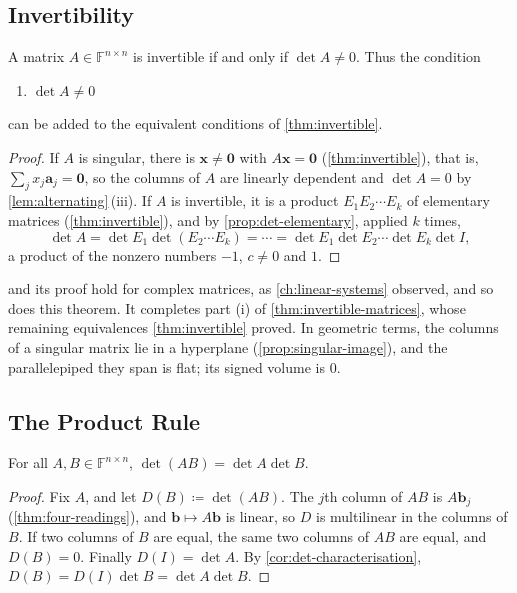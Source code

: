 \subsection{Invertibility}

\begin{theorem}
\label{thm:det-invertible}
A matrix $A\in\mathbb F^{n\times n}$ is invertible if and only if $\det A\ne0$. Thus the condition
\begin{enumerate}
\item[(x)] $\det A\ne0$
\end{enumerate}
can be added to the equivalent conditions of \cref{thm:invertible}.
\end{theorem}

\begin{proof}
If $A$ is singular, there is $\mathbf x\ne\mathbf 0$ with $A\mathbf x=\mathbf 0$ (\cref{thm:invertible}), that is, $\sum_jx_j\mathbf a_j=\mathbf 0$, so the columns of $A$ are linearly dependent and $\det A=0$ by \cref{lem:alternating}\,(iii). If $A$ is invertible, it is a product $E_1E_2\cdots E_k$ of elementary matrices (\cref{thm:invertible}), and by \cref{prop:det-elementary}, applied $k$ times,
\[
\det A=\det E_1\det(E_2\cdots E_k)=\cdots=\det E_1\det E_2\cdots\det E_k\det I ,
\]
a product of the nonzero numbers $-1$, $c\ne0$ and $1$.
\end{proof}

 and its proof hold for complex matrices, as \cref{ch:linear-systems} observed, and so does this theorem. It completes part (i) of \cref{thm:invertible-matrices}, whose remaining equivalences \cref{thm:invertible} proved. In geometric terms, the columns of a singular matrix lie in a hyperplane (\cref{prop:singular-image}), and the parallelepiped they span is flat; its signed volume is $0$.

\subsection{The Product Rule}

\begin{theorem}
\label{thm:det-product}
For all $A,B\in\mathbb F^{n\times n}$, $\det(AB)=\det A\det B$.
\end{theorem}

\begin{proof}
Fix $A$, and let $D(B)\coloneqq\det(AB)$. The $j$th column of $AB$ is $A\mathbf b_j$ (\cref{thm:four-readings}), and $\mathbf b\mapsto A\mathbf b$ is linear, so $D$ is multilinear in the columns of $B$. If two columns of $B$ are equal, the same two columns of $AB$ are equal, and $D(B)=0$. Finally $D(I)=\det A$. By \cref{cor:det-characterisation}, $D(B)=D(I)\det B=\det A\det B$.
\end{proof}

